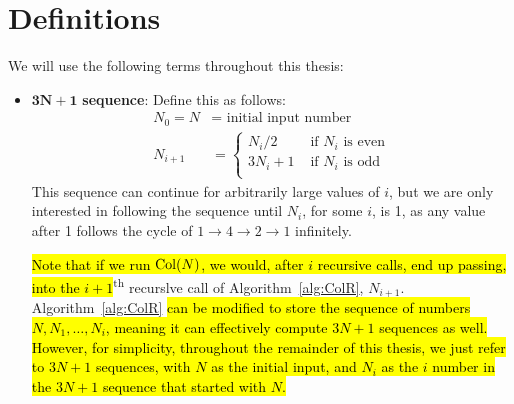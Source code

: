 \chapter{Definitions} \label{sec:defns}
We will use the following terms throughout this thesis:
\begin{itemize}
    \item $\boldsymbol{3N+1}$\textbf{ sequence}: Define this as follows: 
    \begin{align*}
        N_0 = N &= \text{ initial input number} \\
        N_{i+1} &= \begin{cases} 
        N_{i}/2 &\text{ if $N_i$ is even} \\
        3 N_{i} + 1 &\text{ if $N_i$ is odd} \\
        \end{cases}
    \end{align*}
    This sequence can continue for arbitrarily large values of $i$, but we are only interested in following the sequence until $N_i$, for some $i$, is 1, as any value after 1 follows the cycle of $1 \rightarrow 4 \rightarrow 2 \rightarrow 1$ infinitely. \par
    \hl{Note that if we run $\mathrm{Col}(N)$, we would, after $i$ recursive calls, end up passing, into the $i+1$}\textsuperscript{th} recurslve call of Algorithm~\ref{alg:ColR}, $N_{i+1}$. Algorithm~\ref{alg:ColR} \hl{can be modified to store the sequence of numbers $N, N_1, \ldots, N_i$, meaning it can effectively compute $3N+1$ sequences as well. However, for simplicity, throughout the remainder of this thesis, we just refer to $3N+1$ sequences, with $N$ as the initial input, and $N_i$ as the $i$ number in the $3N+1$ sequence that started with $N$.}


\end{itemize}
